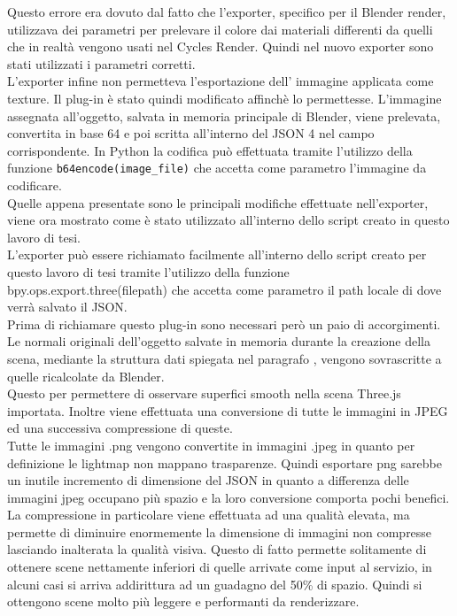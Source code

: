 Questo errore era dovuto dal fatto che l’exporter, specifico per il Blender render, utilizzava dei parametri per prelevare il colore dai materiali differenti da quelli che in realtà vengono usati nel Cycles Render. Quindi nel nuovo exporter sono stati utilizzati i parametri corretti.
\\
L’exporter infine non permetteva l’esportazione dell’ immagine applicata come texture. 
Il plug-in è stato quindi modificato affinchè lo permettesse.
L’immagine assegnata all’oggetto, salvata in memoria principale di Blender, viene prelevata, convertita in base 64  e poi scritta all’interno del JSON 4 nel campo corrispondente.  
In Python la codifica può effettuata tramite l’utilizzo della funzione \texttt{b64encode(image\_file)} che accetta come parametro l’immagine da codificare. 
\\
Quelle appena presentate sono le principali modifiche effettuate nell’exporter, viene ora  mostrato come è stato utilizzato all’interno dello script creato in questo lavoro di tesi. 
\\
L’exporter può essere richiamato facilmente all’interno dello script creato per questo lavoro di tesi tramite l’utilizzo della funzione bpy.ops.export.three(filepath) che accetta come parametro il path locale di dove verrà salvato il JSON.
\\
Prima di richiamare questo plug-in sono necessari però un paio di accorgimenti.
Le normali originali dell’oggetto salvate in memoria durante la creazione della scena, mediante la struttura dati spiegata nel paragrafo \label{sec:chapter_baking_service_pipeline_baking_caricam_scena}, vengono sovrascritte a quelle ricalcolate da Blender. 
\\
Questo per permettere di osservare superfici smooth nella scena Three.js importata.
Inoltre viene effettuata una conversione di tutte le immagini in JPEG ed una successiva compressione di queste.
\\
Tutte le immagini .png vengono convertite in immagini .jpeg in quanto per definizione le lightmap non mappano trasparenze. Quindi esportare png sarebbe un inutile incremento di dimensione del JSON in quanto a differenza delle immagini jpeg occupano più spazio e la loro conversione comporta pochi benefici.
\\
La compressione in particolare  viene effettuata ad una qualità elevata, ma permette di diminuire enormemente la dimensione di immagini non compresse lasciando inalterata la qualità visiva.
Questo di fatto permette solitamente di ottenere scene nettamente inferiori di quelle arrivate come input al servizio, in alcuni casi si arriva addirittura ad un guadagno del 50\% di spazio. Quindi si ottengono scene molto più leggere e performanti da renderizzare.
